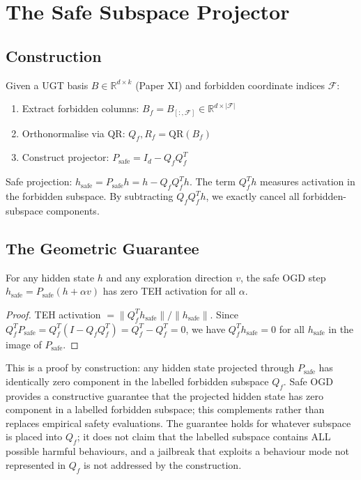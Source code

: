 \documentclass[11pt]{article}
\begin{document}
\section{The Safe Subspace Projector}

\subsection{Construction}

Given a UGT basis $B \in \mathbb{R}^{d \times k}$ (Paper XI) and forbidden coordinate indices $\mathcal{F}$:
\begin{enumerate}[nosep]
\item Extract forbidden columns: $B_f = B_{[:,\mathcal{F}]} \in \mathbb{R}^{d \times |\mathcal{F}|}$
\item Orthonormalise via QR: $Q_f, R_f = \mathrm{QR}(B_f)$
\item Construct projector: $P_{\mathrm{safe}} = I_d - Q_f Q_f^T$
\end{enumerate}
Safe projection: $h_{\mathrm{safe}} = P_{\mathrm{safe}} h = h - Q_f Q_f^T h$. The term $Q_f^T h$ measures activation in the forbidden subspace. By subtracting $Q_f Q_f^T h$, we exactly cancel all forbidden-subspace components.

\subsection{The Geometric Guarantee}

\begin{theorem}[Safety]
For any hidden state $h$ and any exploration direction $v$, the safe OGD step $h_{\mathrm{safe}} = P_{\mathrm{safe}}(h + \alpha v)$ has zero TEH activation for all $\alpha$.
\end{theorem}

\begin{proof}
TEH activation $= \|Q_f^T h_{\mathrm{safe}}\| / \|h_{\mathrm{safe}}\|$. Since $Q_f^T P_{\mathrm{safe}} = Q_f^T(I - Q_f Q_f^T) = Q_f^T - Q_f^T = 0$, we have $Q_f^T h_{\mathrm{safe}} = 0$ for all $h_{\mathrm{safe}}$ in the image of $P_{\mathrm{safe}}$.
\end{proof}

This is a proof by construction: any hidden state projected through $P_{\mathrm{safe}}$ has identically zero component in the labelled forbidden subspace $Q_f$. Safe OGD provides a constructive guarantee that the projected hidden state has zero component in a labelled forbidden subspace; this complements rather than replaces empirical safety evaluations. The guarantee holds for whatever subspace is placed into $Q_f$; it does not claim that the labelled subspace contains ALL possible harmful behaviours, and a jailbreak that exploits a behaviour mode not represented in $Q_f$ is not addressed by the construction.
\end{document}

